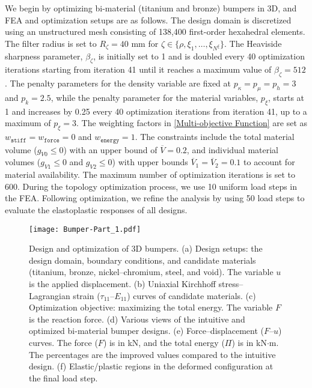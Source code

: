 \documentclass[preprint,11pt]{elsarticle}
\theoremstyle{definition}
\begin{document}
We begin by optimizing bi-material (titanium and bronze) bumpers in 3D, and FEA and optimization setups are as follows. The design domain is discretized using an unstructured mesh consisting of 138,400 first-order hexahedral elements. The filter radius is set to $R_\zeta = 40$ mm for $\zeta \in \{\rho, \xi_1, \ldots, \xi_{N^\xi} \}$. The Heaviside sharpness parameter, $\beta_\zeta$, is initially set to 1 and is doubled every 40 optimization iterations starting from iteration 41 until it reaches a maximum value of $\beta_\zeta = 512$. The penalty parameters for the density variable are fixed at $p_\kappa = p_\mu = p_h = 3$ and $p_k = 2.5$, while the penalty parameter for the material variables, $p_\xi$, starts at 1 and increases by 0.25 every 40 optimization iterations from iteration 41, up to a maximum of $p_\xi = 3$. The weighting factors in \eqref{Multi-objective Function} are set as $w_\texttt{stiff} = w_\texttt{force} = 0$ and $w_\texttt{energy} = 1$. The constraints include the total material volume ($g_{V0} \leq 0$) with an upper bound of $\overline{V} = 0.2$, and individual material volumes ($g_{V1} \leq 0$ and $g_{V2} \leq 0$) with upper bounds $\overline{V}_1 = \overline{V}_2 = 0.1$ to account for material availability. The maximum number of optimization iterations is set to 600. During the topology optimization process, we use 10 uniform load steps in the FEA. Following optimization, we refine the analysis by using 50 load steps to evaluate the elastoplastic responses of all designs.

\begin{figure}[!htbp]
    \centering
    \texttt{[image: Bumper-Part\_1.pdf]}
    \caption{Design and optimization of 3D bumpers. (a) Design setups: the design domain, boundary conditions, and candidate materials (titanium, bronze, nickel--chromium, steel, and void). The variable $u$ is the applied displacement. (b) Uniaxial Kirchhoff stress--Lagrangian strain ($\tau_{11}$--$E_{11}$) curves of candidate materials. (c) Optimization objective: maximizing the total energy. The variable $F$ is the reaction force. (d) Various views of the intuitive and optimized bi-material bumper designs. (e) Force--displacement ($F$--$u$) curves. The force ($F$) is in kN, and the total energy ($\Pi$) is in kN$\cdot$m. The percentages are the improved values compared to the intuitive design. (f) Elastic/plastic regions in the deformed configuration at the final load step.}
    \label{Fig: Bumper-Part 1}
\end{figure}
\end{document}
